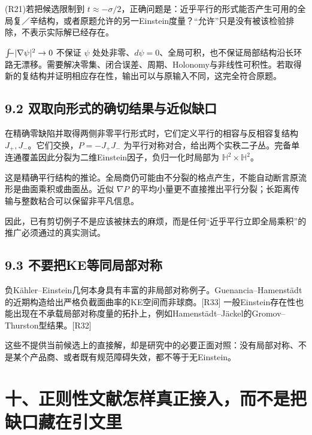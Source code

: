 \documentclass[
  11pt,
  a4paper,
  fontset=none]{ctexart}
\newcommand{\avgint}{\mathchoice{\displaystyle\int\!\!\!\!-}{\textstyle\int\!\!\!-}{\scriptstyle\int\!\!\!-}{\scriptscriptstyle\int\!\!\!-}}
\begin{document}
(R21)若把候选限制到
\(t\approx-\sigma/2\)，正确问题是：近乎平行的形式能否产生可用的全局复／辛结构，或者原题允许的另一Einstein度量？``允许''只是没有被该检验排除，不表示实际解已经存在。

\(\avgint|\nabla\psi|^2\to0\) 不保证 \(\psi\)
处处非零、\(d\psi=0\)、全局可积，也不保证局部结构沿长环路无漂移。需要解决零集、闭合误差、周期、Holonomy与非线性可积性。若取得新的复结构并证明相应存在性，输出可以与原输入不同，这完全符合原题。

\subsection{9.2
双取向形式的确切结果与近似缺口}\label{ux53ccux53d6ux5411ux5f62ux5f0fux7684ux786eux5207ux7ed3ux679cux4e0eux8fd1ux4f3cux7f3aux53e3}

在精确零缺陷并取得两侧非零平行形式时，它们定义平行的相容与反相容复结构
\(J_+,J_-\)。它们交换，\(P=-J_+J_-\)
为平行对称对合，给出两个实秩二子丛。完备单连通覆盖因此分裂为二维Einstein因子，负归一化时局部为
\(\mathbb H^2\times\mathbb H^2\)。

这是精确平行结构的推论。全局商仍可能由不分裂的格点产生，不能自动断言原流形是曲面乘积或曲面丛。近似
\(\nabla P\)
的平均小量更不直接推出平行分裂；长距离传输与整数粘合可以保留非平凡信息。

因此，已有剪切例子不是应该被抹去的麻烦，而是任何``近乎平行立即全局乘积''的推广必须通过的真实测试。

\subsection{9.3
不要把KE等同局部对称}\label{ux4e0dux8981ux628akeux7b49ux540cux5c40ux90e8ux5bf9ux79f0}

负Kähler--Einstein几何本身具有丰富的非局部对称例子。Guenancia--Hamenstädt的近期构造给出严格负截面曲率的KE空间而非球商。{[}R33{]}
一般Einstein存在性也能出现在不承载局部对称度量的拓扑上，例如Hamenstädt--Jäckel的Gromov--Thurston型结果。{[}R32{]}

这些不提供当前候选上的直接解，却是研究中的必要正面对照：没有局部对称、不是某个产品商、或者既有规范障碍失效，都不等于无Einstein。

\section{十、正则性文献怎样真正接入，而不是把缺口藏在引文里}\label{ux5341ux6b63ux5219ux6027ux6587ux732eux600eux6837ux771fux6b63ux63a5ux5165ux800cux4e0dux662fux628aux7f3aux53e3ux85cfux5728ux5f15ux6587ux91cc}
\end{document}
